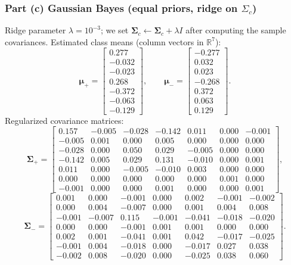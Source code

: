 \documentclass[fleqn]{article}
\begin{document}
    \subsubsection*{Part (c) Gaussian Bayes (equal priors, ridge on $\Sigma_c$)}
    Ridge parameter $\lambda=10^{-3}$; we set $\boldsymbol{\Sigma}_c\leftarrow \boldsymbol{\Sigma}_c+\lambda I$ after computing the sample covariances.
    Estimated class means (column vectors in $\mathbb{R}^7$):
    \[
        \boldsymbol{\mu}_+=
        \begin{bmatrix}
            0.277 \\ -0.032 \\ -0.023 \\ 0.268 \\ -0.372 \\ -0.063 \\ -0.129
        \end{bmatrix},
        \qquad
        \boldsymbol{\mu}_-=
        \begin{bmatrix}
            -0.277 \\ 0.032 \\ 0.023 \\ -0.268 \\ 0.372 \\ 0.063 \\ 0.129
        \end{bmatrix}.
    \]
    Regularized covariance matrices:
    {\footnotesize
    \[
        \boldsymbol{\Sigma}_+=
        \begin{bmatrix}
            0.157 & -0.005 & -0.028 & -0.142 & 0.011 & 0.000 & -0.001 \\
            -0.005 & 0.001 & 0.000 & 0.005 & 0.000 & 0.000 & 0.000 \\
            -0.028 & 0.000 & 0.050 & 0.029 & -0.005 & 0.000 & 0.000 \\
            -0.142 & 0.005 & 0.029 & 0.131 & -0.010 & 0.000 & 0.001 \\
            0.011 & 0.000 & -0.005 & -0.010 & 0.003 & 0.000 & 0.000 \\
            0.000 & 0.000 & 0.000 & 0.000 & 0.000 & 0.001 & 0.000 \\
            -0.001 & 0.000 & 0.000 & 0.001 & 0.000 & 0.000 & 0.001
        \end{bmatrix},
    \]
    \[
        \boldsymbol{\Sigma}_-=
        \begin{bmatrix}
            0.001 & 0.000 & -0.001 & 0.000 & 0.002 & -0.001 & -0.002 \\
            0.000 & 0.004 & -0.007 & 0.000 & 0.001 & 0.004 & 0.008 \\
            -0.001 & -0.007 & 0.115 & -0.001 & -0.041 & -0.018 & -0.020 \\
            0.000 & 0.000 & -0.001 & 0.001 & 0.001 & 0.000 & 0.000 \\
            0.002 & 0.001 & -0.041 & 0.001 & 0.042 & -0.017 & -0.025 \\
            -0.001 & 0.004 & -0.018 & 0.000 & -0.017 & 0.027 & 0.038 \\
            -0.002 & 0.008 & -0.020 & 0.000 & -0.025 & 0.038 & 0.060
        \end{bmatrix}.
    \]
    }%
\end{document}
